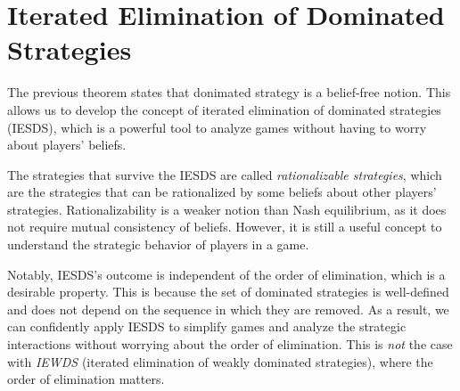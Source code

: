 \section{Iterated Elimination of Dominated Strategies}

The previous theorem states that donimated strategy is a belief-free notion. This allows us to develop the concept of iterated elimination of dominated strategies (IESDS), which is a powerful tool to analyze games without having to worry about players' beliefs.

The strategies that survive the IESDS are called \textit{rationalizable strategies}, which are the strategies that can be rationalized by some beliefs about other players' strategies. Rationalizability is a weaker notion than Nash equilibrium, as it does not require mutual consistency of beliefs. However, it is still a useful concept to understand the strategic behavior of players in a game.

Notably, IESDS's outcome is independent of the order of elimination, which is a desirable property. This is because the set of dominated strategies is well-defined and does not depend on the sequence in which they are removed. As a result, we can confidently apply IESDS to simplify games and analyze the strategic interactions without worrying about the order of elimination. This is \textit{not} the case with \textit{IEWDS} (iterated elimination of weakly dominated strategies), where the order of elimination matters.




